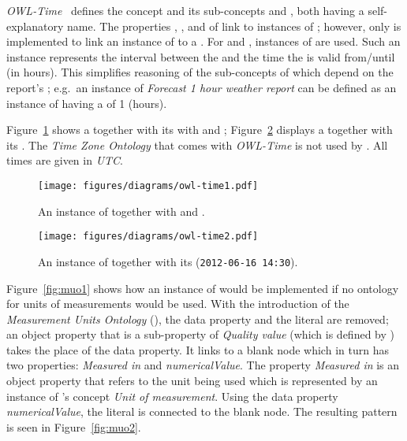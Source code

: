 \vspace{1em}

\emph{OWL-Time}~\cite{owl-time} defines the concept  and its sub-concepts  and , both having a self-explanatory name. The properties , , and  of  link to instances of ; however, only  is implemented to link an instance of  to a . For  and , instances of  are used. Such an instance represents the interval between the  and the time the  is valid from/until (in hours). This simplifies reasoning of the sub-concepts of  which depend on the report's ; e.g.\ an instance of \emph{Forecast 1 hour weather report} can be defined as an instance of  having a  of \num{1} (hours).

Figure~\ref{fig:owl_time1} shows a  together with its with  and ; Figure~\ref{fig:owl_time2} displays a  together with its . The \emph{Time Zone Ontology} that comes with \emph{OWL-Time} is not used by \smarthomeweather. All times are given in \emph{UTC}.

\begin{figure}
  \centering
  \texttt{[image: figures/diagrams/owl-time1.pdf]}
  \caption[An instance of ]{An instance of  together with  and .}
  \label{fig:owl_time1}
\end{figure}

\begin{figure}
  \centering
  \texttt{[image: figures/diagrams/owl-time2.pdf]}
  \caption[A instance of ]{An instance of  together with its  (\texttt{2012-06-16~14:30}).}
  \label{fig:owl_time2}
\end{figure}

\vspace{1em}

Figure~\ref{fig:muo1} shows how an instance of  would be implemented if no ontology for units of measurements would be used. With the introduction of the \emph{Measurement Units Ontology} (\muo), the data property and the literal are removed; an object property that is a sub-property of \emph{Quality value} (which is defined by \muo) takes the place of the data property. It links to a blank node which in turn has two properties: \emph{Measured in} and \emph{numericalValue}. The property \emph{Measured in} is an object property that refers to the unit being used which is represented by an instance of \muo's concept \emph{Unit of measurement}. Using the data property \emph{numericalValue}, the literal is connected to the blank node. The resulting pattern is seen in Figure~\ref{fig:muo2}.

